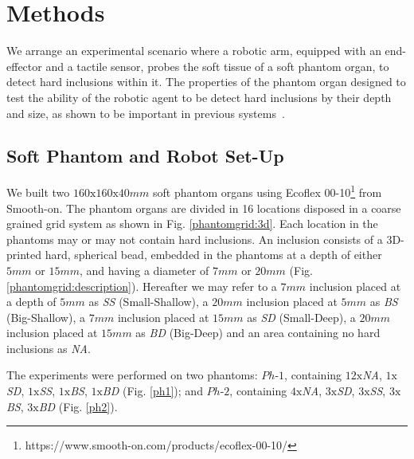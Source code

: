 \section{Methods} \label{sec_methods}
\color{red}We arrange an experimental scenario where a robotic arm, equipped with an end-effector and a tactile sensor, probes the soft tissue of a soft phantom organ, to detect hard inclusions within it. The properties of the phantom organ designed to test the ability of the robotic agent to be detect hard inclusions by their depth and size, as shown to be important in previous systems~\cite{herzig2018variable}.
\color{black}

\subsection{Soft Phantom and Robot Set-Up} \label{sec_experimental_setups}
We built two $160\text{x}160\text{x}40mm$ soft phantom organs using Ecoflex 00-10\footnote[2]
{https://www.smooth-on.com/products/ecoflex-00-10/} from Smooth-on. The phantom organs are divided in 16 
locations disposed in a coarse grained grid system as shown in Fig. \ref{phantomgrid:3d}. Each location in the 
phantoms may or may not contain hard inclusions. An inclusion consists of a 3D-printed hard, spherical bead, 
embedded in the phantoms at a depth of either $5mm$ or $15mm$, and having a diameter of 
$7mm$ or $20mm$ (Fig. \ref{phantomgrid:description}). Hereafter we may refer to a $7mm$ inclusion 
placed at a depth of $5mm$ as \textit{SS} (Small-Shallow), a $20mm$ inclusion placed at $5mm$ as \textit{BS} 
(Big-Shallow), a $7mm$ inclusion placed at $15mm$ as \textit{SD} (Small-Deep), a $20mm$ inclusion placed at 
$15mm$ as \textit{BD} (Big-Deep) and an area containing no hard inclusions as \textit{NA}.

The experiments were performed on two phantoms: $Ph\text{-}1$, containing $12\text{x}$\textit{NA}, $1\text{x}$\textit{SD}, $1\text{x}$\textit{SS}, $1\text{x}$\textit{BS}, $1\text{x}$\textit{BD} (Fig. \ref{ph1}); and $Ph\text{-}2$, containing $4\text{x}$\textit{NA}, $3\text{x}$\textit{SD}, $3\text{x}$\textit{SS}, $3\text{x}$\textit{BS}, $3\text{x}$\textit{BD} (Fig. \ref{ph2}).

